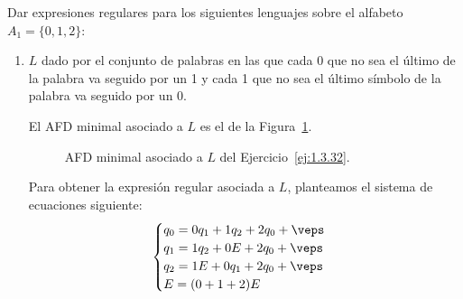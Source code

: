 \begin{ejercicio}\label{ej:1.3.32}
    Dar expresiones regulares para los siguientes lenguajes sobre el alfabeto $A_1=\{0,1,2\}$:
    \begin{enumerate}
        \item $L$ dado por el conjunto de palabras en las que cada 0 que no sea el último de la palabra va seguido por un 1 y cada 1 que no sea el último símbolo de la palabra va seguido por un 0.
        
        El AFD minimal asociado a $L$ es el de la Figura~\ref{fig:1.3.32-L}.
        \begin{figure}
            \centering
            \caption{AFD minimal asociado a $L$ del Ejercicio~\ref{ej:1.3.32}.}
            \label{fig:1.3.32-L}
        \end{figure}

        Para obtener la expresión regular asociada a $L$, planteamos el sistema de ecuaciones siguiente:
        \begin{equation*}
            \begin{cases}
                q_0 = 0q_1 + 1q_2+2q_0+\veps\\
                q_1 = 1q_2 + 0E+2q_0 + \veps\\
                q_2 = 1E + 0q_1+2q_0 + \veps\\
                E = (0+1+2)E
            \end{cases}
        \end{equation*}


\end{enumerate}
\end{ejercicio}
